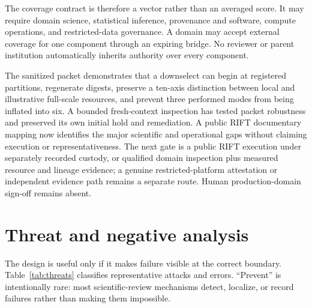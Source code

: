 \documentclass[11pt]{article}
\begin{document}
The coverage contract is therefore a vector rather than an averaged score. It may require domain science, statistical inference, provenance and software, compute operations, and restricted-data governance. A domain may accept external coverage for one component through an expiring bridge. No reviewer or parent institution automatically inherits authority over every component.

\begin{evidencegate}
The sanitized packet demonstrates that a downselect can begin at registered partitions, regenerate digests, preserve a ten-axis distinction between local and illustrative full-scale resources, and prevent three performed modes from being inflated into six. A bounded fresh-context inspection has tested packet robustness and preserved its own initial hold and remediation. A public RIFT documentary mapping now identifies the major scientific and operational gaps without claiming execution or representativeness. The next gate is a public RIFT execution under separately recorded custody, or qualified domain inspection plus measured resource and lineage evidence; a genuine restricted-platform attestation or independent evidence path remains a separate route. Human production-domain sign-off remains absent.
\end{evidencegate}

\section{Threat and negative analysis}
\label{sec:threats}

The design is useful only if it makes failure visible at the correct boundary. Table~\ref{tab:threats} classifies representative attacks and errors. ``Prevent'' is intentionally rare: most scientific-review mechanisms detect, localize, or record failures rather than making them impossible.
\end{document}
